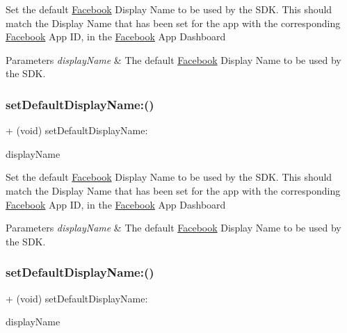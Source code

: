 Set the default \hyperlink{interfaceFacebook}{Facebook} Display Name to be used by the S\+DK. This should match the Display Name that has been set for the app with the corresponding \hyperlink{interfaceFacebook}{Facebook} App ID, in the \hyperlink{interfaceFacebook}{Facebook} App Dashboard


\begin{DoxyParams}{Parameters}
{\em display\+Name} & The default \hyperlink{interfaceFacebook}{Facebook} Display Name to be used by the S\+DK. \\
\hline
\end{DoxyParams}
\mbox{\label{interfaceFBSettings_a783ff4cf8b998eadfbfe2d95efef24a1}} 
\subsubsection{\texorpdfstring{set\+Default\+Display\+Name\+:()}{setDefaultDisplayName:()}\hspace{0.1cm}{\footnotesize\ttfamily [2/5]}}
{\footnotesize\ttfamily + (void) set\+Default\+Display\+Name\+: \begin{DoxyParamCaption}\item[{(N\+S\+String $\ast$)}]{display\+Name }\end{DoxyParamCaption}}

Set the default \hyperlink{interfaceFacebook}{Facebook} Display Name to be used by the S\+DK. This should match the Display Name that has been set for the app with the corresponding \hyperlink{interfaceFacebook}{Facebook} App ID, in the \hyperlink{interfaceFacebook}{Facebook} App Dashboard


\begin{DoxyParams}{Parameters}
{\em display\+Name} & The default \hyperlink{interfaceFacebook}{Facebook} Display Name to be used by the S\+DK. \\
\hline
\end{DoxyParams}
\mbox{\label{interfaceFBSettings_a783ff4cf8b998eadfbfe2d95efef24a1}} 
\subsubsection{\texorpdfstring{set\+Default\+Display\+Name\+:()}{setDefaultDisplayName:()}\hspace{0.1cm}{\footnotesize\ttfamily [3/5]}}
{\footnotesize\ttfamily + (void) set\+Default\+Display\+Name\+: \begin{DoxyParamCaption}\item[{(N\+S\+String $\ast$)}]{display\+Name }\end{DoxyParamCaption}}

